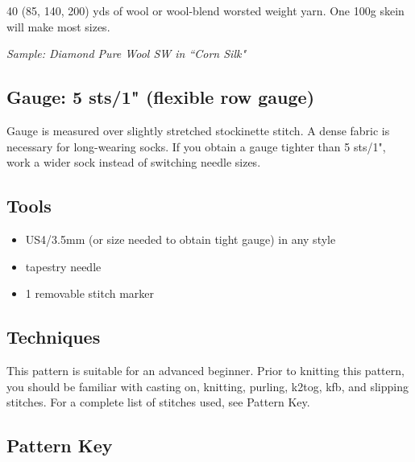 \documentclass[12pt]{article}
\begin{document}
\begin{titlingpage}
\begin{multicols}{2}
40 (85, 140, 200) yds of wool or wool-blend worsted weight yarn. One 100g skein will make most sizes.

\emph{Sample: Diamond Pure Wool SW in ``Corn Silk"}

\subsection*{Gauge: 5 sts/1" (flexible row gauge)}

Gauge is measured over slightly stretched stockinette stitch. A dense fabric is necessary for long-wearing socks. If you obtain a gauge tighter than 5 sts/1", work a wider sock instead of switching needle sizes.

\vfill
\columnbreak
\subsection*{Tools}

\begin{itemize}
\item US4/3.5mm (or size needed to obtain tight gauge) in any style %
\item tapestry needle
\item 1 removable stitch marker%
\end{itemize}

\subsection*{Techniques}

This pattern is suitable for an advanced beginner. %
Prior to knitting this pattern, you should be familiar with casting on, knitting, purling, k2tog, kfb, and slipping stitches. %
For a complete list of stitches used, see Pattern Key.


\subsection*{Pattern Key}


\end{multicols}
\end{titlingpage}
\end{document}
